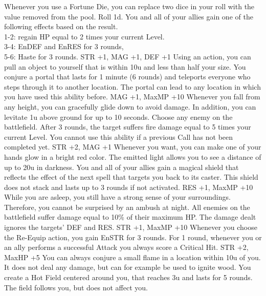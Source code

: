 {Whenever you use a Fortune Die, you can replace two dice in your roll with the value removed from the pool.}
{Roll 1d. You and all of your allies gain one of the following effects based on the result.\\ 1-2: regain HP equal to 2 times your current Level.\\ 3-4: EnDEF and EnRES for 3 rounds,\\ 5-6: Haste for 3 rounds.}
{STR +1, MAG +1, DEF +1}
%
\vfill
%
{Using an action, you can pull an object to yourself that is within 10u and less than half your size.}
{You conjure a portal that lasts for 1 minute (6 rounds) and teleports everyone who steps through it to another location. The portal can lead to any location in which you have used this ability before.}
{MAG +1, MaxMP +10}
%
\vfill
%
{Whenever you fall from any height, you can gracefully glide down to avoid damage. In addition, you can levitate 1u above ground for up to 10 seconds.}
{Choose any enemy on the battlefield. After 3 rounds, the target suffers fire damage equal to 5 times your current Level. You cannot use this ability if a previous Call has not been completed yet.}
{STR +2, MAG +1}
%
\clearpage
%
{Whenever you want, you can make one of your hands glow in a bright red color. The emitted light allows you to see a distance of up to 20u in darkness.}
{You and all of your allies gain a magical shield that reflects the effect of the next spell that targets you back to its caster. This shield does not stack and lasts up to 3 rounds if not activated.}
{RES +1, MaxMP +10}
%
\vfill
%
{While you are asleep, you still have a strong sense of your surroundings. Therefore, you cannot be surprised by an ambush at night.}
{All enemies on the battlefield suffer damage equal to 10\% of their maximum HP. The damage dealt ignores the targets' DEF and RES.}
{STR +1, MaxMP +10}
%
\vfill
%
{Whenever you choose the Re-Equip action, you gain EnSTR for 3 rounds.}
{For 1 round, whenever you or an ally performs a successful Attack you always score a Critical Hit.}
{STR +2, MaxHP +5}
%
\vfill
%
{You can always conjure a small flame in a location within 10u of you. It does not deal any damage, but can for example be used to ignite wood.}
{You create a Hot Field centered around you, that reaches 3u and lasts for 5 rounds. The field follows you, but does not affect you.}
